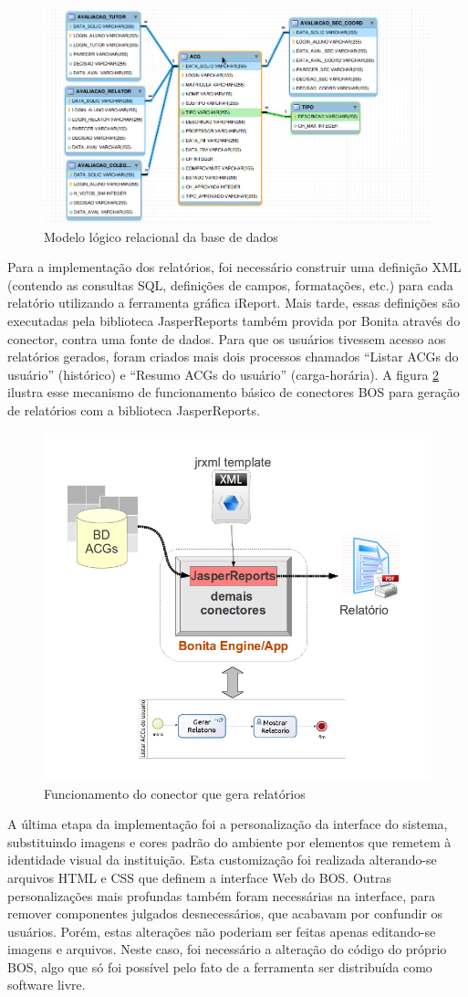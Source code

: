 \documentclass[12pt]{article}
\begin{document}
\begin{figure}[ht]
\centering
\includegraphics[width=.8\textwidth]{images/bancoLogico.png}
\caption{Modelo lógico relacional da base de dados}
\label{fig:bd}
\end{figure}

Para a implementação dos relatórios, foi necessário construir uma definição XML (contendo as consultas SQL, definições de campos, formatações, etc.)  para cada relatório utilizando a ferramenta gráfica iReport. Mais tarde, essas definições são executadas pela biblioteca JasperReports também provida por Bonita através do conector, contra uma fonte de dados. Para que os usuários tivessem acesso aos relatórios gerados, foram criados mais dois processos chamados “Listar ACGs do usuário” (histórico) e “Resumo ACGs do usuário” (carga-horária). A figura \ref{fig:reports} ilustra esse mecanismo de funcionamento básico de conectores BOS para geração de relatórios com a biblioteca JasperReports.

\begin{figure}[ht]
\centering
\includegraphics[width=.5\textwidth]{images/conector.png}
\caption{Funcionamento do conector que gera relatórios}
\label{fig:reports}
\end{figure}


A última etapa da implementação foi a personalização da interface do sistema, substituindo imagens e cores padrão do ambiente por elementos que remetem à identidade visual da instituição. Esta customização foi realizada alterando-se arquivos HTML e CSS que definem a interface Web do BOS. Outras personalizações mais profundas também foram necessárias na interface, para remover componentes julgados desnecessários, que acabavam por confundir os usuários. Porém, estas alterações não poderiam ser feitas apenas editando-se imagens e arquivos. Neste caso, foi necessário a alteração do código do próprio BOS, algo que só foi possível pelo fato de a ferramenta ser distribuída como software livre.
\end{document}
